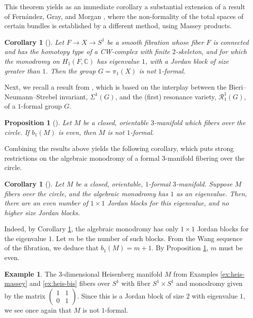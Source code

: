 \documentclass{article}
\numberwithin{equation}{section}
\newtheorem{corollary}[theorem]{Corollary}
\newtheorem{proposition}[theorem]{Proposition}
\theoremstyle{definition}
\newtheorem{example}[theorem]{Example}
\renewcommand{\C}{\mathbb{C}}
\newcommand{\RR}{\mathcal{R}}
\begin{document}
This theorem yields as an immediate corollary 
a substantial extension of a result of Fern\'{a}ndez, Gray, and 
Morgan \cite{FGM}, where the non-formality of the total spaces 
of certain bundles is established by a different method, 
using Massey products.

\begin{corollary}[\cite{PS-forum}]
\label{cor:bundles}
Let $F\to X\to S^1$ be a smooth fibration 
whose fiber $F$ is connected and has the homotopy 
type of a CW-complex with finite $2$-skeleton, and  
for which the monodromy on $H_1(F, \C)$ has 
eigenvalue $1$, with a Jordan block of size greater than $1$.  
Then the group $G=\pi_1(X)$ is not $1$-formal.
\end{corollary} 

Next, we recall a result from \cite{PS-plms10}, which is based 
on the interplay between the Bieri--Neumann--Strebel invariant, 
$\Sigma^1(G)$, and the (first) resonance variety, $\RR^1_1(G)$, 
of a $1$-formal group $G$. 

\begin{proposition}[\cite{PS-plms10}]
\label{prop:3mfd-fibers}
Let $M$ be a closed, orientable $3$-manifold which fibers 
over the circle.  If $b_1(M)$ is even, then $M$ is 
not $1$-formal.  
\end{proposition}

Combining the results above yields the following corollary, 
which puts strong restrictions on the algebraic monodromy of 
a formal $3$-manifold fibering over the circle.  

\begin{corollary}[\cite{PS-forum}]
\label{cor:jordan blocks}
Let $M$ be a closed, orientable, $1$-formal $3$-manifold.  
Suppose $M$ fibers over the circle, and the algebraic monodromy has $1$ 
as an eigenvalue.  Then, there are an even number of 
$1\times 1$ Jordan blocks for this eigenvalue, 
and no higher size Jordan blocks.
\end{corollary}

Indeed, by Corollary \ref{cor:bundles}, the algebraic monodromy 
has only $1\times 1$ Jordan blocks for the eigenvalue $1$. 
Let $m$ be the number of such blocks.  From the Wang 
sequence of the fibration, we deduce that $b_1(M)=m+1$. 
By Proposition \ref{prop:3mfd-fibers}, $m$ must be even. 

\begin{example}
\label{ex:heis-mono}
The $3$-dimensional Heisenberg manifold $M$ 
from Examples \ref{ex:heis-massey} and \ref{ex:heis-bis}
fibers over $S^1$ with fiber $S^1\times S^1$ 
and monodromy given by the matrix
$\left( \begin{smallmatrix} 1 & 1\\ 0 & 1 
\end{smallmatrix} \right)$. Since this is a 
Jordan block of size $2$ with eigenvalue $1$, 
we see once again that $M$ is not $1$-formal.
\end{example}
\end{document}
